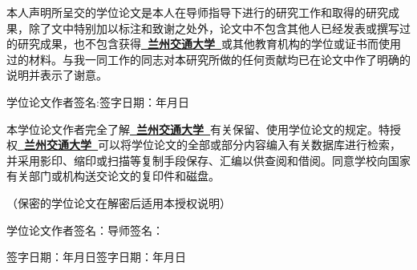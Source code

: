 	\newpage\thispagestyle{empty}
	
	\vspace*{0\baselineskip}
	
	\vspace{1\baselineskip}
	本人声明所呈交的学位论文是本人在导师指导下进行的研究工作和取得的研究成果，除了文中特别加以标注和致谢之处外，论文中不包含其他人已经发表或撰写过的研究成果，也不包含获得\songti\textbf{\underline{\ 兰州交通大学\ }}或其他教育机构的学位或证书而使用过的材料。与我一同工作的同志对本研究所做的任何贡献均已在论文中作了明确的说明并表示了谢意。
	
	\vspace{2\baselineskip}
	\noindent 学位论文作者签名:\hspace{8em}签字日期：\qquad\quad 年\qquad 月\qquad 日
	
	\vspace{6\baselineskip}
	
	\vspace{1\baselineskip}	
	本学位论文作者完全了解\songti\textbf{\underline{\ 兰州交通大学\ }}有关保留、使用学位论文的规定。特授权\songti\textbf{\underline{\ 兰州交通大学\ }}可以将学位论文的全部或部分内容编入有关数据库进行检索，并采用影印、缩印或扫描等复制手段保存、汇编以供查阅和借阅。同意学校向国家有关部门或机构送交论文的复印件和磁盘。
	
	\noindent（保密的学位论文在解密后适用本授权说明）
	
	\vspace{3\baselineskip}
	\noindent 学位论文作者签名：\hspace{11em}导师签名：
	
	\noindent 签字日期：\qquad\quad 年\qquad 月\qquad 日\hspace{5em}签字日期：\qquad\quad 年\qquad 月\qquad 日
